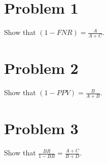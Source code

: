 \documentclass[11pt]{article}
\begin{document}
\newenvironment{note}[1]{\medskip\noindent \textbf{#1:}}%

        {\medskip}


\newenvironment{proof}{ \vspace{0.05in}\noindent{\bf Proof:}}%
        {\hspace*{\fill}$\Box$\par}
\newenvironment{proofsketch}{\noindent{\bf Proof Sketch.}}%
        {\hspace*{\fill}$\Box$\par\vspace{4mm}}
\newenvironment{proofof}[1]{\smallskip\noindent{\bf Proof of #1.}}%
        {\hspace*{\fill}$\Box$\par}

\newcommand{\etal}{{\em et al.}\ }
\newcommand{\assign}{\leftarrow}
\newcommand{\eps}{\epsilon}
\newcommand{\NP}{\textbf{NP}}

\newcommand{\opt}{\textrm{\sc OPT}}
\newcommand{\script}[1]{\mathcal{#1}}
\newcommand{\ceil}[1]{\lceil #1 \rceil}
\newcommand{\floor}[1]{\lfloor #1 \rfloor}

\newcommand{\expect}{\mbox{\bf E}}
\newcommand{\Var}{\mbox{\bf Var}}

\newcommand{\polylog}{\text{polylog}}


\setlength{\fboxrule}{.5mm}\setlength{\fboxsep}{1.2mm}
\newlength{\boxlength}\setlength{\boxlength}{\textwidth}
\addtolength{\boxlength}{-4mm}
\begin{center}\end{center}
\vspace{5mm}

\section{Problem 1}
Show that $(1-FNR) = \frac{A}{A+C}$.

\section{Problem 2}
Show that $(1-PPV) = \frac{B}{A+B}$.

\section{Problem 3}
Show that $\frac{BR}{1-BR} = \frac{A+C}{B+D}$.
\end{document}

